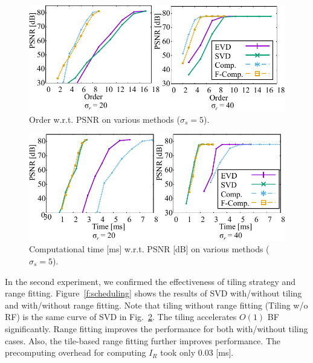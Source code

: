 \documentclass{article}
\begin{document}
\begin{figure}[t]
\centering
\includegraphics[width=\columnwidth]{fig/order_psnr.pdf}
\vspace{-6mm}
\caption{Order w.r.t. PSNR on various methods ($\sigma_s = 5$).}
\label{f:order_sigma}
\vspace{-3mm}
\end{figure}
\begin{figure}[t]
\centering
\includegraphics[width=\columnwidth]{fig/time_psnr.pdf}
\vspace{-6mm}
\caption{Computational time [ms] w.r.t. PSNR [dB] on various methods ($\sigma_s = 5$).}
\vspace{-3mm}
\label{f:time_sigma}
\end{figure}

In the second experiment, we confirmed the effectiveness of tiling strategy and range fitting. Figure~\ref{f:scheduling} shows the results of SVD with/without tiling and with/without range fitting. Note that tiling without range fitting (Tiling w/o RF) is the same curve of SVD in Fig.~\ref{f:time_sigma}.
The tiling accelerates $O(1)$ BF significantly.
Range fitting improves the performance for both with/without tiling cases.
Also, the tile-based range fitting further improves performance.
The precomputing overhead for computing $I_{R}$ took only 0.03 [ms].
\end{document}
